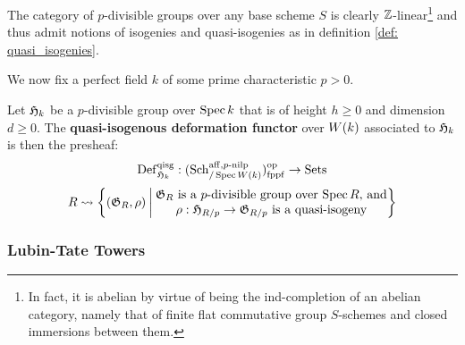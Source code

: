            \begin{example} \label{example: quasi_isogenies_between_p_divisible_groups}
                The category of $p$-divisible groups over any base scheme $S$ is clearly $\mathbb{Z}$-linear\footnote{In fact, it is abelian by virtue of being the ind-completion of an abelian category, namely that of finite flat commutative group $S$-schemes and closed immersions between them.} and thus admit notions of isogenies and quasi-isogenies as in definition \ref{def: quasi_isogenies}. 
            \end{example}
            \begin{convention}
                We now fix a perfect field $k$ of some prime characteristic $p > 0$. 
            \end{convention}
            \begin{definition} \label{def: quasi_isogenous_deformations_of_p_divisible_groups}
                Let $\mathfrak{H}_k$ be a $p$-divisible group over $\operatorname{Spec} k$ that is of height $h \geq 0$ and dimension $d \geq 0$. The \textbf{quasi-isogenous deformation functor} over $W(k)$ associated to $\mathfrak{H}_k$ is then the presheaf:
                    $$\mathrm{Def}_{\mathfrak{H}_k}^{\mathrm{qisg}}: (\mathrm{Sch}_{/\operatorname{Spec} W(k)}^{\mathrm{aff}, p\text{-}\mathrm{nilp}})_{\mathrm{fppf}}^{\mathrm{op}} \to \mathrm{Sets}$$
                    $$
                        R \leadsto
                        \left\{
                            (\mathfrak{G}_R, \rho) \: \bigg| \:
                            \begin{matrix}
                                \text{$\mathfrak{G}_R$ is a $p$-divisible group over $\operatorname{Spec} R$, and}
                                \\
                                \text{$\rho: \mathfrak{H}_{R/p} \to \mathfrak{G}_{R/p}$ is a quasi-isogeny}
                            \end{matrix}
                        \right\}
                    $$
            \end{definition}
        
        \subsubsection{Lubin-Tate Towers}